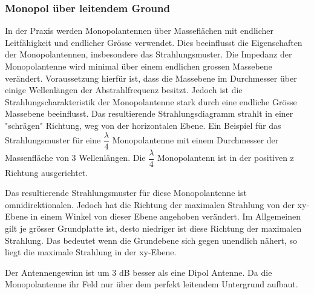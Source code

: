 \subsubsection{Monopol über leitendem Ground}
In der Praxis werden Monopolantennen über Masseflächen mit endlicher Leitfähigkeit und endlicher Grösse verwendet. Dies beeinflusst die Eigenschaften der Monopolantennen, insbesondere das  Strahlungsmuster. Die Impedanz der Monopolantenne wird minimal über einem endlichen grossen Massebene verändert. Voraussetzung hierfür ist, dass die Massebene  im Durchmesser über einige  Wellenlängen der Abstrahlfrequenz besitzt. Jedoch ist die Strahlungscharakteristik der Monopolantenne stark durch eine endliche Grösse Massebene beeinflusst. Das resultierende
 Strahlungsdiagramm strahlt in einer "schrägen" Richtung, weg von
  der horizontalen Ebene. Ein Beispiel für das Strahlungsmuster für eine 
  $\dfrac{\lambda}{4}$ 
  Monopolantenne mit einem Durchmesser der Massenfläche von 3 Wellenlängen. 
  Die  $\dfrac{\lambda}{4}$  Monopolantenn ist in der positiven z Richtung ausgerichtet.


Das resultierende Strahlungsmuster für diese Monopolantenne ist  omnidirektionalen. Jedoch hat die Richtung der maximalen Strahlung von der xy-Ebene in einem Winkel von dieser Ebene angehoben verändert. Im Allgemeinen gilt je  grösser Grundplatte ist, desto niedriger ist diese Richtung der maximalen Strahlung. Das bedeutet wenn die Grundebene sich gegen  unendlich nähert, so liegt die maximale  Strahlung  in der xy-Ebene.

Der Antennengewinn ist  um 3 dB besser als eine Dipol Antenne. Da die Monopolantenne ihr Feld nur über dem perfekt leitendem Untergrund aufbaut.
